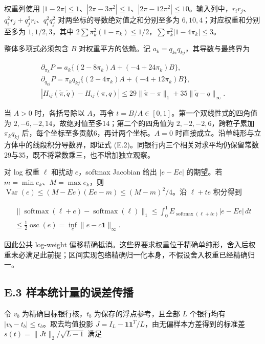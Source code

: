 \documentclass[11pt,a4paper]{article}
\begin{document}
权重列使用
\(|1-2\pi|\le1\)、\(|2\pi-3\pi^2|\le1\)、\(|2\pi-12\pi^2|\le10\)。输入列中，\(r_ir_j\)、\(q_i^2r_j+q_j^2r_i\)、\(q_i^2q_j^2\)
对两坐标的导数绝对值之和分别至多为 \(6,10,4\)；对应权重和分别至多为
\(1,1/2,3\)，其中
\(2\sum\pi_k^2(1-\pi_k)\le1/2\)，\(\sum\pi_k^2|1-4\pi_k|\le3\)。

整体多项式必须包含 \(B\) 对权重平方的依赖。记
\(a_k=q_{ki}q_{kj}\)，其导数与最终界为

\[
\begin{gathered}
\partial_{\pi_k}P=a_k\{(2-8\pi_k)A+(-4+24\pi_k)B\},\\
\partial_{q_{ki}}P=\pi_kq_{kj}\{(2-4\pi_k)A+(-4+12\pi_k)B\},\\
|H_{ij}(\widetilde\pi,\widetilde q)-H_{ij}(\pi,q)|
\le29\|\widetilde\pi-\pi\|_1+35\|\widetilde q-q\|_\infty.
\end{gathered}
\tag{E.2}
\]

当 \(A>0\) 时，各括号除以 \(A\)，再令
\(t=B/A\in[0,1]\)。第一个双线性式的四角值为
\(2,-6,-2,14\)，故绝对值至多14；第二个的四角值为
\(2,-2,-2,6\)，跨粒子累加 \(\pi_kq_{kj}\)
后，每个坐标至多贡献6，再计两个坐标。\(A=0\)
时直接成立。沿单纯形与立方体中的线段积分导数界，即证式
(E.2)。同银行内三个相关对求平均仍保留常数29与35，既不将常数乘三，也不增加独立观察。

对 log 权重 \(\ell\) 和扰动 \(e\)，softmax Jacobian 给出 \(|e-Ee|\)
的期望。若 \(m=\min e_k\)、\(M=\max e_k\)，则
\(\operatorname{Var}(e)\le(M-Ee)(Ee-m)\le(M-m)^2/4\)。沿 \(\ell+te\)
积分得到

\[
\begin{gathered}
\|\operatorname{softmax}(\ell+e)-\operatorname{softmax}(\ell)\|_1
\le\int_0^1E_{\operatorname{softmax}(\ell+te)}|e-Ee|\,dt\\
\le\tfrac12\operatorname{osc}(e)
=\inf_c\|e-c\mathbf1\|_\infty.
\end{gathered}
\tag{E.3}
\]

因此公共 log-weight
偏移精确抵消。这些界要求权重位于精确单纯形，舍入后权重未必满足此前提；区间实现包络精确归一化本身，不假设舍入权重已经精确归一。

\subsection*{E.3
样本统计量的误差传播}\label{e.3-ux6837ux672cux7edfux8ba1ux91cfux7684ux8befux5deeux4f20ux64ad}

令 \(v_b\) 为精确目标银行核，\(t_b\) 为保存的浮点参考，且全部 \(L\)
个银行均有 \(|v_b-t_b|\le\epsilon_b\)。取去均值投影
\(J=I_L-\mathbf1\mathbf1^T/L\)，由无偏样本方差得到的标准差
\(s(t)=\|Jt\|_2/\sqrt{L-1}\) 满足
\end{document}

